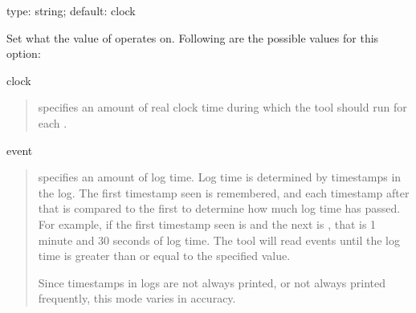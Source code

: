 \documentclass[letterpaper,10pt,english]{sphinxmanual}
\begin{document}
\begin{fulllineitems}
\label{\detokenize{mariadb-query-digest:cmdoption-mariadb-query-digest-run-time-mode}}
\sphinxAtStartPar
type: string; default: clock

\sphinxAtStartPar
Set what the value of {\hyperref[\detokenize{mariadb-query-digest:cmdoption-mariadb-query-digest-run-time}]{}} operates on.  Following are the possible
values for this option:

\sphinxAtStartPar
clock
\begin{quote}

\sphinxAtStartPar
{\hyperref[\detokenize{mariadb-query-digest:cmdoption-mariadb-query-digest-run-time}]{}} specifies an amount of real clock time during which the tool
should run for each {\hyperref[\detokenize{mariadb-query-digest:cmdoption-mariadb-query-digest-iterations}]{}}.
\end{quote}

\sphinxAtStartPar
event
\begin{quote}

\sphinxAtStartPar
{\hyperref[\detokenize{mariadb-query-digest:cmdoption-mariadb-query-digest-run-time}]{}} specifies an amount of log time.  Log time is determined by
timestamps in the log.  The first timestamp seen is remembered, and each
timestamp after that is compared to the first to determine how much log time
has passed.  For example, if the first timestamp seen is  and the
next is , that is 1 minute and 30 seconds of log time.  The tool
will read events until the log time is greater than or equal to the specified
{\hyperref[\detokenize{mariadb-query-digest:cmdoption-mariadb-query-digest-run-time}]{}} value.

\sphinxAtStartPar
Since timestamps in logs are not always printed, or not always printed
frequently, this mode varies in accuracy.
\end{quote}


\end{fulllineitems}
\end{document}
